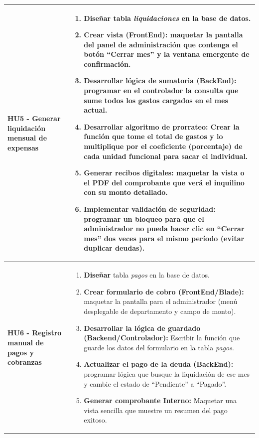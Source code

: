 \begin{longtable}{|p{4.5cm}|p{10.5cm}|}
    \\ \hline

        \textbf{HU5 - Generar liquidación mensual de expensas} 
        
        & 

            \begin{enumerate}[leftmargin=*,nosep]
                \item Diseñar tabla \textit{liquidaciones} en la base de datos.
                \item \textbf{Crear vista (FrontEnd):} maquetar la pantalla del panel de administración que contenga el botón ``Cerrar mes'' y la ventana emergente de confirmación.
                \item \textbf{Desarrollar lógica de sumatoria (BackEnd):} programar en el controlador la consulta que sume todos los gastos cargados en el mes actual.
                \item \textbf{Desarrollar algoritmo de prorrateo:} Crear la función que tome el total de gastos y lo multiplique por el coeficiente (porcentaje) de cada unidad funcional para sacar el individual.
                \item \textbf{Generar recibos digitales:} maquetar la vista o el PDF del comprobante que verá el inquilino con su monto detallado.
                \item \textbf{Implementar validación de seguridad:} programar un bloqueo para que el administrador no pueda hacer clic en ``Cerrar mes'' dos veces para el mismo período (evitar duplicar deudas).
            \end{enumerate} 
        
    \\ \hline

        \textbf{HU6 - Registro manual de pagos y cobranzas} 
        
        & 

            \begin{enumerate}[leftmargin=*,nosep]
                \item \textbf{Diseñar} tabla \textit{pagos} en la base de datos.
                \item \textbf{Crear formulario de cobro (FrontEnd/Blade):} maquetar la pantalla para el administrador (menú desplegable de departamento y campo de monto).
                \item \textbf{Desarrollar la lógica de guardado (Backend/Controlador):} Escribir la función que guarde los datos del formulario en la tabla \textit{pagos}.
                \item \textbf{Actualizar el pago de la deuda (BackEnd):} programar lógica que busque la liquidación de ese mes y cambie el estado de ``Pendiente'' a ``Pagado''.
                \item \textbf{Generar comprobante Interno:} Maquetar una vista sencilla que muestre un resumen del pago exitoso.
            \end{enumerate} 
        

\end{longtable}
